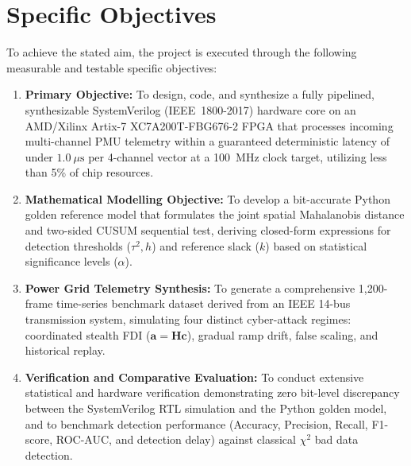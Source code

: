 \documentclass[11pt,a4paper]{report}
\begin{document}
\section{Specific Objectives}
To achieve the stated aim, the project is executed through the following measurable
and testable specific objectives:
\begin{enumerate}
    \item \textbf{Primary Objective:} To design, code, and synthesize a fully
    pipelined, synthesizable SystemVerilog (IEEE~1800-2017) hardware core on an
    AMD/Xilinx Artix-7 XC7A200T-FBG676-2 FPGA that processes incoming multi-channel
    PMU telemetry within a guaranteed deterministic latency of under $1.0~\mu\text{s}$
    per 4-channel vector at a 100~MHz clock target, utilizing less than 5\% of
    chip resources.
    \item \textbf{Mathematical Modelling Objective:} To develop a bit-accurate
    Python golden reference model that formulates the joint spatial Mahalanobis
    distance and two-sided CUSUM sequential test, deriving closed-form expressions
    for detection thresholds ($\tau^2, h$) and reference slack ($k$) based on
    statistical significance levels ($\alpha$).
    \item \textbf{Power Grid Telemetry Synthesis:} To generate a comprehensive
    1,200-frame time-series benchmark dataset derived from an IEEE 14-bus transmission
    system, simulating four distinct cyber-attack regimes: coordinated stealth FDI
    ($\boldsymbol{a} = \boldsymbol{H}\boldsymbol{c}$), gradual ramp drift,
    false scaling, and historical replay.
    \item \textbf{Verification and Comparative Evaluation:} To conduct extensive
    statistical and hardware verification demonstrating zero bit-level discrepancy
    between the SystemVerilog RTL simulation and the Python golden model, and to
    benchmark detection performance (Accuracy, Precision, Recall, F1-score, ROC-AUC,
    and detection delay) against classical $\chi^2$ bad data detection.
\end{enumerate}
\end{document}
